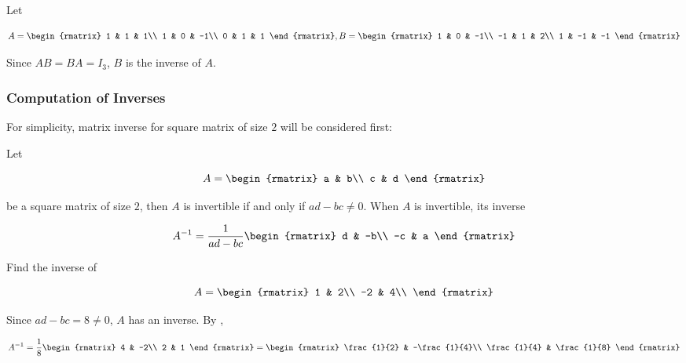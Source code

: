 \documentclass[a4paper,12pt]{article}
\begin{document}
\begin{exm}
  Let

  $$A=\begin{rmatrix}
    1 & 1 & 1\\
    1 & 0 & -1\\
    0 & 1 & 1
  \end{rmatrix},B=\begin{rmatrix}
    1 & 0 & -1\\
    -1 & 1 & 2\\
    1 & -1 & -1
  \end{rmatrix}$$\s

  Since $AB=BA=I_{3}$, $B$ is the inverse of $A$.
\end{exm}

\subsubsection{Computation of Inverses}
For simplicity, matrix inverse for square matrix of size $2$ will be considered first:\n

\begin{thm}
  Let

  $$A=\begin{rmatrix}
    a & b\\
    c & d
  \end{rmatrix}$$\s

  be a square matrix of size $2$, then $A$ is invertible if and only if $ad-bc\neq 0$. When $A$ is invertible, its inverse

  $$A^{-1}=\frac{1}{ad-bc}\begin{rmatrix}
    d & -b\\
    -c & a
  \end{rmatrix}$$
\end{thm}\n

\begin{exm}
  Find the inverse of
  
  $$A=\begin{rmatrix}
    1 & 2\\
    -2 & 4\\
  \end{rmatrix}$$\s

  \ans Since $ad-bc=8\neq 0$, $A$ has an inverse. By \rthm[\sctd{1}],

  $$A^{-1}=\frac{1}{8}\begin{rmatrix}
    4 & -2\\
    2 & 1
  \end{rmatrix}=\begin{rmatrix}
    \frac{1}{2} & -\frac{1}{4}\\
    \frac{1}{4} & \frac{1}{8}
  \end{rmatrix}$$
\end{exm}\n
\end{document}
